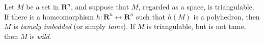 Let $M$ be a set in $\mathbf{R}^n$, and suppose that $M$, regarded as a space, is triangulable. If there is a homeomorphism $h: \mathbf{R}^n \leftrightarrow \mathbf{R}^n$ such that $h(M)$ is a polyhedron, then $M$ is \textit{tamely imbedded} (or simply \textit{tame}). If $M$ is triangulable, but is not tame, then $M$ is \textit{wild}.
